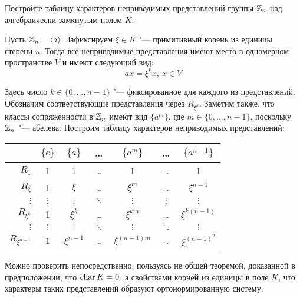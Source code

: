 \begin{problem}
	Постройте таблицу характеров неприводимых представлений группы $\mathbb{Z}_n$ над алгебраически замкнутым полем $K$.
\end{problem}

\begin{solution}
	Пусть $\mathbb{Z}_n  = \langle a \rangle$. Зафиксируем $\xi \in K$ "--- примитивный корень из единицы степени $n$. Тогда все неприводимые представления имеют место в одномерном пространстве $V$ и имеют следующий вид:
	\[ax = \xi^k x,~x \in V\]
	
	Здесь число $k \in \{0, \dotsc, n - 1\}$ "--- фиксированное для каждого из представлений. Обозначим соответствующие представления через $R_{\xi^k}$. Заметим также, что классы сопряженности в $\mathbb{Z}_n$ имеют вид $\{a^m\}$, где $m \in \{0, \dotsc, n - 1\}$, поскольку $\mathbb{Z}_n$ "--- абелева. Построим таблицу характеров неприводимых представлений:
	\begin{center}
		\begin{tabular}{r|c|c|c|c|c|c}
			            & $\{e\}$  & $\{a\}$  &  \dots   & $\{a^m\}$  &  \dots  & $\{a^{n-1}\}$  \\ 
			            \hline
			   $R_1$    &    1     &    1     &  \dots   &     1      &  \dots  & 1 \\
			  $R_\xi$   &    1     &  $\xi$   &  \dots   &  $\xi^m$   &  \dots  & $\xi^{n-1}$ \\
			 $\vdots$   & $\vdots$ & $\vdots$ & $\ddots$ & $\vdots $  & $\vdots$ & $\vdots$ \\
			$R_{\xi^k}$ &    1     & $\xi^k$  &  \dots   & $\xi^{km}$ &  \dots  &  $\xi^{k(n-1)}$ \\
			 $\vdots$   & $\vdots$ & $\vdots$ & $\ddots$ &  $\vdots$  & $\ddots$ & $\vdots$\\
		 $R_{\xi^{n-1}}$ &    $1$     & $\xi^{n-1}$  &  \dots   & $\xi^{(n-1)m}$ &  \dots  &  $\xi^{(n-1)^2}$ \\
		\end{tabular}
	\end{center}

	Можно проверить непосредственно, пользуясь не общей теоремой, доказанной в предположении, что $\operatorname{char}{K} = 0$, а свойствами корней из единицы в поле $K$, что характеры таких представлений образуют ортонормированную систему.
\end{solution}